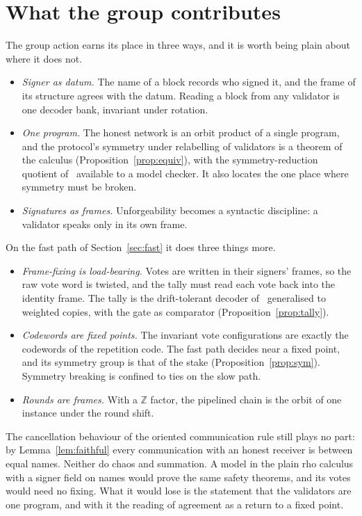 \documentclass[11pt]{article}
\theoremstyle{definition}
\theoremstyle{remark}
\begin{document}
\section{What the group contributes}\label{sec:group}

The group action earns its place in three ways, and it is worth being plain
about where it does not.
\begin{itemize}[leftmargin=1.5em]
\item \emph{Signer as datum.} The name of a block records who signed it, and
  the frame of its structure agrees with the datum. Reading a block from any
  validator is one decoder bank, invariant under rotation.
\item \emph{One program.} The honest network is an orbit product of a single
  program, and the protocol's symmetry under relabelling of validators is a
  theorem of the calculus (Proposition~\ref{prop:equiv}), with the
  symmetry-reduction quotient of~\cite[\S4]{oriented} available to a model
  checker. It also locates the one place where symmetry must be broken.
\item \emph{Signatures as frames.} Unforgeability becomes a syntactic
  discipline: a validator speaks only in its own frame.
\end{itemize}
On the fast path of Section~\ref{sec:fast} it does three things more.
\begin{itemize}[leftmargin=1.5em]
\item \emph{Frame-fixing is load-bearing.} Votes are written in their signers'
  frames, so the raw vote word is twisted, and the tally must read each vote
  back into the identity frame. The tally is the drift-tolerant decoder
  of~\cite[\S7]{oriented} generalised to weighted copies, with the gate as
  comparator (Proposition~\ref{prop:tally}).
\item \emph{Codewords are fixed points.} The invariant vote configurations
  are exactly the codewords of the repetition code. The fast path decides near
  a fixed point, and its symmetry group is that of the stake
  (Proposition~\ref{prop:sym}). Symmetry breaking is confined to ties on the
  slow path.
\item \emph{Rounds are frames.} With a $\mathbb{Z}$ factor, the pipelined
  chain is the orbit of one instance under the round shift.
\end{itemize}
The cancellation behaviour of the oriented communication rule still plays no
part: by Lemma~\ref{lem:faithful} every communication with an honest receiver
is between equal names. Neither do chaos and summation. A model in the plain
rho calculus with a signer field on names would prove the same safety
theorems, and its votes would need no fixing. What it would lose is the
statement that the validators are one program, and with it the reading of
agreement as a return to a fixed point.
\end{document}
